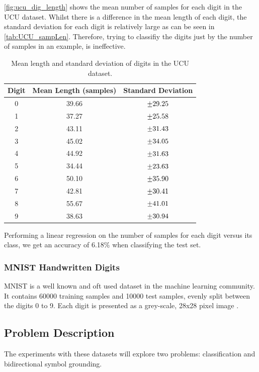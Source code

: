 \autoref{fig:ucu_dig_length} shows the mean number of samples for each digit in the UCU dataset. Whilst there is a difference in the mean length of each digit, the standard deviation for each digit is relatively large as can be seen in \autoref{tab:UCU_sampLen}. Therefore, trying to classifiy the digits just by the number of samples in an example, is ineffective.

	\begin{table}
		\centering
		\begin{tabular}{|c|c|c|}
			\hline
			\textbf{Digit} & \textbf{Mean Length (samples)} & \textbf{Standard Deviation} \\ \hline
			0 & 39.66 & $\mypm 29.25$ \\ \hline
			1 & 37.27 & $\mypm 25.58$ \\ \hline
			2 & 43.11 & $\mypm 31.43$ \\ \hline
			3 & 45.02 & $\mypm 34.05$ \\ \hline
			4 & 44.92 & $\mypm 31.63$ \\ \hline
			5 & 34.44 & $\mypm 23.63$ \\ \hline
			6 & 50.10 & $\mypm 35.90$ \\ \hline
			7 & 42.81 & $\mypm 30.41$ \\ \hline
			8 & 55.67 & $\mypm 41.01$ \\ \hline
			9 & 38.63 & $\mypm 30.94$ \\ \hline

		\end{tabular}
		\caption{Mean length and standard deviation of digits in the UCU dataset.}
		\label{tab:UCU_sampLen}
	\end{table}


Performing a linear regression on the number of samples for each digit versus its class, we get an accuracy of 6.18\% when classifying the test set.

\subsubsection{MNIST Handwritten Digits}
MNIST is a well known and oft used dataset in the machine learning community. It contains 60000 training samples and 10000 test samples, evenly split between the digits 0 to 9. 
Each digit is presented as a grey-scale, 28x28 pixel image \cite{lecun1998mnist}. 

\subsection{Problem Description}
The experiments with these datasets will explore two problems: classification and bidirectional symbol grounding. 


